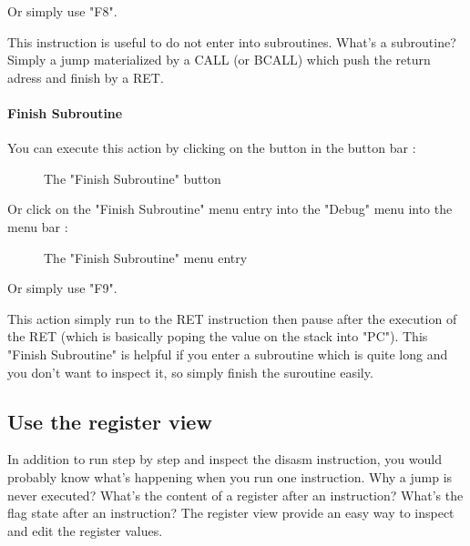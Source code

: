 \documentclass[10pt]{report}
\begin{document}
Or simply use "F8".\newline\newline

This instruction is useful to do not enter into subroutines.\newline
What's a subroutine?\newline
Simply a jump materialized by a CALL (or BCALL) which push the return adress and finish by a RET.\newline

\paragraph{Finish Subroutine}

You can execute this action by clicking on the button in the button bar :\newline
\begin{figure}[H]
\centering
{}
\caption{The "Finish Subroutine" button} 
\end{figure}

Or click on the "Finish Subroutine" menu entry into the "Debug" menu into the menu bar :\newline
\begin{figure}[H]
\centering
{}
\caption{The "Finish Subroutine" menu entry} 
\end{figure}

Or simply use "F9".\newline

This action simply run to the RET instruction then pause after the execution of the RET (which is basically poping the value on the stack into "PC").\newline
This "Finish Subroutine" is helpful if you enter a subroutine which is quite long and you don't want to inspect it, so simply finish the suroutine easily.\newline

\subsection{Use the register view}
In addition to run step by step and inspect the disasm instruction, you would probably know what's happening when you run one instruction.\newline
Why a jump is never executed? What's the content of a register after an instruction?
What's the flag state after an instruction?\newline\newline
The register view provide an easy way to inspect and edit the register values.\newline\newline
\end{document}
